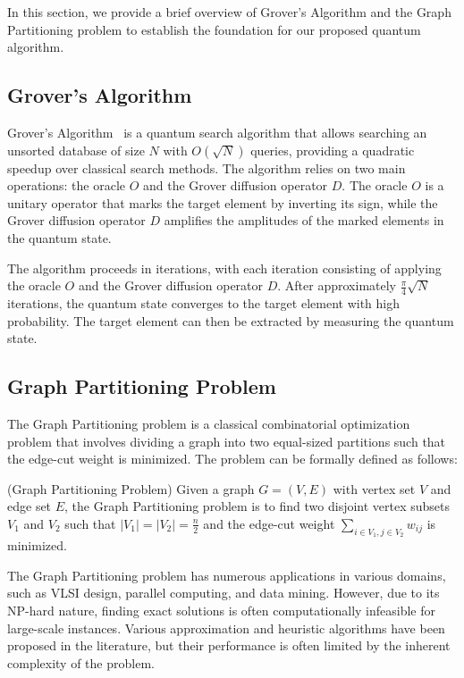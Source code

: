 In this section, we provide a brief overview of Grover's Algorithm and the Graph Partitioning problem to establish the foundation for our proposed quantum algorithm.

\subsection{Grover's Algorithm}

Grover's Algorithm~\cite{grover} is a quantum search algorithm that allows searching an unsorted database of size $N$ with $O(\sqrt{N})$ queries, providing a quadratic speedup over classical search methods. The algorithm relies on two main operations: the oracle $O$ and the Grover diffusion operator $D$. The oracle $O$ is a unitary operator that marks the target element by inverting its sign, while the Grover diffusion operator $D$ amplifies the amplitudes of the marked elements in the quantum state.

The algorithm proceeds in iterations, with each iteration consisting of applying the oracle $O$ and the Grover diffusion operator $D$. After approximately $\frac{\pi}{4}\sqrt{N}$ iterations, the quantum state converges to the target element with high probability. The target element can then be extracted by measuring the quantum state.

\subsection{Graph Partitioning Problem}

The Graph Partitioning problem is a classical combinatorial optimization problem that involves dividing a graph into two equal-sized partitions such that the edge-cut weight is minimized. The problem can be formally defined as follows:

\begin{definition}
(Graph Partitioning Problem) Given a graph $G=(V,E)$ with vertex set $V$ and edge set $E$, the Graph Partitioning problem is to find two disjoint vertex subsets $V_1$ and $V_2$ such that $|V_1|=|V_2|=\frac{n}{2}$ and the edge-cut weight $\sum_{i \in V_1, j \in V_2} w_{ij}$ is minimized.
\end{definition}

The Graph Partitioning problem has numerous applications in various domains, such as VLSI design, parallel computing, and data mining. However, due to its NP-hard nature, finding exact solutions is often computationally infeasible for large-scale instances. Various approximation and heuristic algorithms have been proposed in the literature, but their performance is often limited by the inherent complexity of the problem.

